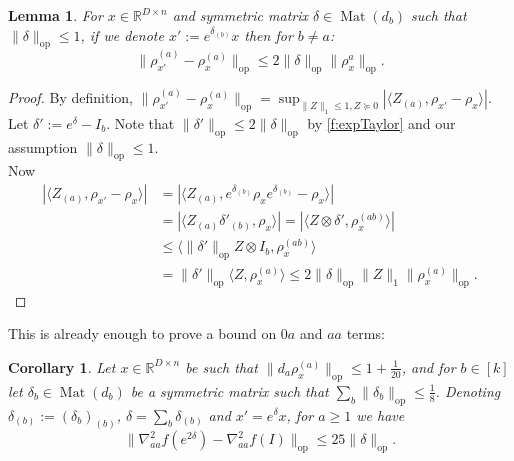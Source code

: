 \documentclass[aos]{imsart}
\newtheorem{corollary}[theorem]{Corollary}
\newtheorem{lemma}[theorem]{Lemma}
\theoremstyle{definition}
\numberwithin{equation}{section}
\DeclareMathOperator{\op}{op}
\DeclareMathOperator{\Mat}{Mat}
\newcommand{\R}{{\mathbb{R}}}
\newcommand{\samp}{x}
\newcommand{\CF}[1]{{\color{purple}[CF: #1]}}
\newcommand{\AR}[1]{{\color{orange}[AR: #1]}}
\newcommand{\CF}[1]{{}}
\newcommand{\AR}[1]{{}}
\begin{document}
\begin{appendix}
\begin{lemma} \label{btoaaRobustness}
For $\samp \in \R^{D \times n}$ and symmetric matrix $\delta \in \Mat(d_{b})$ such that $\|\delta\|_{\op} \leq 1$, if we denote $\samp' := e^{\delta_{(b)}} \samp$ then for $b \neq a$:
\[ \|\rho_{\samp'}^{(a)} - \rho_{\samp}^{(a)}\|_{\op} \leq 2 \|\delta\|_{\op} \|\rho_{\samp}^{a}\|_{\op} .    \]
\end{lemma}
\begin{proof}
By definition, $\|\rho_{\samp'}^{(a)} - \rho_{\samp}^{(a)}\|_{\op} = \sup_{\|Z\|_{1} \leq 1, Z \succeq 0} |\langle Z_{(a)}, \rho_{\samp'} - \rho_{\samp} \rangle|$. \\
Let $\delta' := e^{\delta} - I_b$.
Note that $\|\delta'\|_{\op} \leq 2 \|\delta\|_{\op}$ by \cref{f:expTaylor} and our assumption $\|\delta\|_{\op} \leq 1$. \\
Now
\begin{align*}
|\langle Z_{(a)}, \rho_{\samp'} - \rho_{\samp} \rangle|
& = | \langle Z_{(a)}, e^{\delta_{(b)}}\rho_{\samp} e^{\delta_{(b)}} - \rho_{\samp} \rangle|\\
& = | \langle Z_{(a)} \delta'_{(b)}, \rho_{\samp} \rangle   |
= | \langle Z \otimes \delta', \rho_{\samp}^{(ab)} \rangle   | \\
&\leq \langle \|\delta'\|_{\op} Z \otimes  I_b , \rho_{\samp}^{(ab)} \rangle\\
&= \|\delta'\|_{\op} \langle Z, \rho_{\samp}^{(a)} \rangle \leq 2\|\delta\|_{\op} \|Z\|_1 \|\rho_{\samp}^{(a)}\|_{\op}.
\end{align*}
\end{proof}



This is already enough to prove a bound on $0a$ and $aa$ terms:

\begin{corollary} \label{diagRobustness}
Let $\samp \in \R^{D \times n}$ be such that $\|d_{a} \rho_{\samp}^{(a)}\|_{\op} \leq 1 + \frac{1}{20}$, and for $b \in [k]$ let $\delta_b \in \Mat(d_b)$ be a  symmetric matrix such that $\sum_{b} \|\delta_{b}\|_{\op} \leq \frac{1}{8}$. Denoting $\delta_{(b)} := (\delta_b)_{(b)}$,  $\delta = \sum_b \delta_{(b)}$ and $x' = e^{\delta} \samp$, for $a \geq 1$ we have
\[ \|\nabla^{2}_{aa} f(e^{2\delta}) - \nabla^{2}_{aa} f(I)\|_{\op} \leq 25 \|\delta\|_{\op} .  \]


\end{corollary}
\end{appendix}
\end{document}
